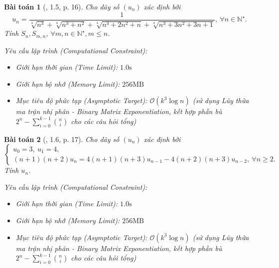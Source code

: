 \documentclass{article}
\newtheorem{baitoan}{Bài toán}
\begin{document}
\begin{baitoan}[\cite{Quoc_Long_Dat_Nam_VMC}, 1.5, p. 16]
	Cho dãy số $(u_n)$ xác định bởi
	\begin{equation*}
		u_n = \frac{1}{\sqrt[4]{n^3} + \sqrt[4]{n^3 + n^2} + \sqrt[4]{n^3 + 2n^2 + n} + \sqrt[4]{n^3 + 3n^2 + 3n + 1}},\ \forall n\in\mathbb{N}^\star.
	\end{equation*}
	Tính $S_n,S_{m,n}$, $\forall m,n\in\mathbb{N}^\star,m\le n$.

    \vspace{0.5em}
    \emph{Yêu cầu lập trình (Computational Constraint):}
    \begin{itemize}
        \item Giới hạn thời gian (Time Limit): $1.0\mathrm{s}$
        \item Giới hạn bộ nhớ (Memory Limit): $256\mathrm{MB}$
        \item Mục tiêu độ phức tạp (Asymptotic Target): $\mathcal{O}(k^3 \log n)$ (sử dụng Lũy thừa ma trận nhị phân - Binary Matrix Exponentiation, kết hợp phần bù $2^n - \sum_{i=0}^{k-1} \binom{n}{i}$ cho các câu hỏi tổng)
    \end{itemize}
\end{baitoan}


\begin{baitoan}[\cite{Quoc_Long_Dat_Nam_VMC}, 1.6, p. 17]
	Cho dãy số $(u_n)$ xác định bởi
	\begin{equation*}
		\begin{cases}
			u_0 = 3,\ u_1 = 4,\\
			(n + 1)(n + 2)u_n = 4(n + 1)(n + 3)u_{n-1} - 4(n + 2)(n + 3)u_{n-2},\ \forall n\ge2.
		\end{cases}
	\end{equation*}
	Tính $u_n$.

    \vspace{0.5em}
    \emph{Yêu cầu lập trình (Computational Constraint):}
    \begin{itemize}
        \item Giới hạn thời gian (Time Limit): $1.0\mathrm{s}$
        \item Giới hạn bộ nhớ (Memory Limit): $256\mathrm{MB}$
        \item Mục tiêu độ phức tạp (Asymptotic Target): $\mathcal{O}(k^3 \log n)$ (sử dụng Lũy thừa ma trận nhị phân - Binary Matrix Exponentiation, kết hợp phần bù $2^n - \sum_{i=0}^{k-1} \binom{n}{i}$ cho các câu hỏi tổng)
    \end{itemize}
\end{baitoan}
\end{document}
